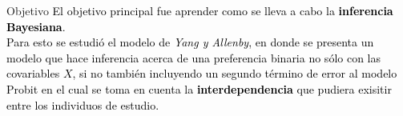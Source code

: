 \setwatermark{\fontsize{74pt}{74pt}\selectfont{\textcolor{mediumelectricblue}{Bayesiana}}}
\begin{frame}{Objetivo}
\textcolor{black}{
El objetivo principal fue aprender como se lleva a cabo la \textbf{inferencia Bayesiana}. \\
Para esto se estudió el modelo de \textit{Yang  y Allenby}\cite{yang2003_interdependent}, en donde se presenta un modelo que hace inferencia acerca de una \alert{preferencia binaria} no sólo con las covariables $X$, si no también incluyendo un segundo término de error al modelo Probit en el cual se toma en cuenta la \textbf{interdependencia} que pudiera exisitir entre los individuos de estudio.}
\end{frame}